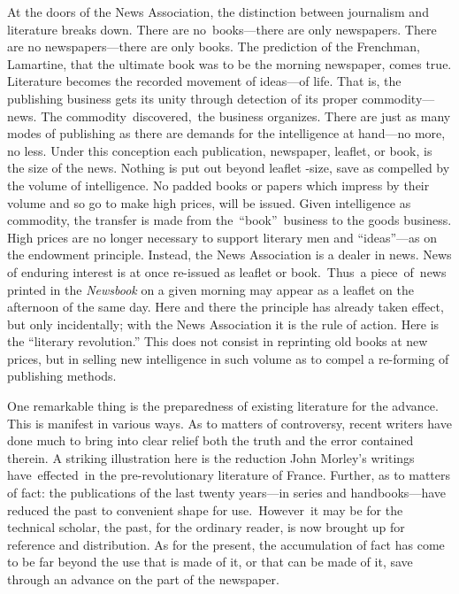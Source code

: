 \documentclass[openany,nobib]{tufte-book}
\begin{document}
At the doors of the News Association, the distinction between journalism
and literature breaks down. There are no~books---there are only
newspapers. There are no newspapers---there are only books. The
prediction of the Frenchman, Lamartine, that the ultimate book was to be
the morning newspaper, comes true. Literature becomes the recorded
movement of ideas---of life. That is, the publishing business gets its
unity through detection of its proper commodity---news. The
commodity~discovered,~the business organizes. There are just as many
modes of publishing as there are demands for the intelligence at
hand---no more, no less. Under this conception each publication,
newspaper, leaflet, or book, is the size of the news. Nothing is put out
beyond leaflet -size, save as compelled by the volume of intelligence.
No padded books or papers which impress by their volume and so go to
make high prices, will be issued. Given intelligence as commodity, the
transfer is made from the~``book''~business to the goods business. High
prices are no longer necessary to support literary men and
``ideas''---as on the endowment principle. Instead, the News Association
is a dealer in news. News of enduring interest is at once re-issued as
leaflet or book.~Thus~a piece~of~news printed in the \emph{Newsbook} on
a given morning may appear as a leaflet on the afternoon of the same
day. Here and there the principle has already taken effect, but only
incidentally; with the News Association it is the rule of action. Here
is the ``literary revolution.'' This does not consist in reprinting old
books at new prices, but in selling new intelligence in such volume as
to compel a re-forming of publishing methods.~

One remarkable thing is the preparedness of existing literature for the
advance. This is manifest in various ways. As to matters of controversy,
recent writers have done much to bring into clear relief both the truth
and the error contained therein. A striking illustration here is the
reduction John Morley's writings have~effected~in the pre-revolutionary
literature of France. Further, as to matters of fact: the publications
of the last twenty years---in series and handbooks---have reduced the
past to convenient shape for use.~However~it may be for the technical
scholar, the past, for the ordinary reader, is now brought up for
reference and distribution. As for the present, the accumulation of fact
has come to be far beyond the use that is made of it, or that can be
made of it, save through an advance on the part of the newspaper.~
\end{document}
